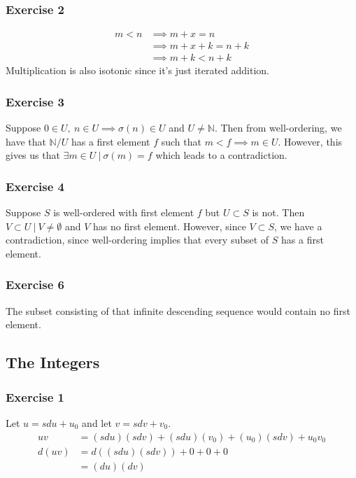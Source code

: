 \subsubsection{Exercise 2}
 \begin{align*}
         m < n &\implies m + x = n \\
               &\implies m + x + k = n + k \\
               &\implies m + k < n + k
\end{align*}
Multiplication is also isotonic since it's just iterated addition.

\subsubsection{Exercise 3}
Suppose $0 \in U, \: n \in U \implies \sigma(n) \in U$ and $U \neq \mathbb{N}$.
Then from well-ordering, we have that $\mathbb{N} / U$ has a first element $f$ 
such that $m < f \implies m \in U$. However, this gives us that
$\exists m \in  U \: | \: \sigma(m) = f$ which leads to a contradiction.

\subsubsection{Exercise 4}
Suppose $S$ is well-ordered with first element $f$ but $U \subset S$ is not.
Then $V \subset U \: | \: V \neq \emptyset$ and $V$ has no first element.
However, since $V \subset S$, we have a contradiction, since well-ordering
implies that every subset of $S$ has a first element.

\subsubsection{Exercise 6}
The subset consisting of that infinite descending sequence would contain no
first element.

\subsection{The Integers}

\subsubsection{Exercise 1}
Let $u = sdu + u_0$ and let $v = sdv + v_0$.
\begin{align*}
        uv &= (sdu) (sdv) + (sdu) (v_0) + (u_0) (sdv) + u_0 v_0 \\ 
        d(uv) &= d((sdu) (sdv)) + 0 + 0 + 0 \\
              &= (du) (dv)
\end{align*}

